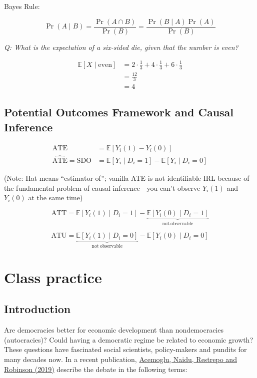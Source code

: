 \documentclass[
  11pt,
  letterpaper]{article}
\begin{document}
Bayes Rule:

\[
\Pr(A \mid B) = \frac{\Pr(A \cap B)}{\Pr(B)} = \frac{\Pr(B \mid A) \Pr(A)}{\Pr(B)}
\]

\emph{Q: What is the expectation of a six-sided die, given that the
number is even?}

\[
\begin{aligned}
\mathbb{E}[X \mid \mathrm{even}]  & = 2 \cdot \frac{1}{3 } + 4 \cdot \frac{1}{3} + 6 \cdot \frac{1}{3} \\
 & = \frac{12}{3} \\
 & = 4
\end{aligned}
\]

\subsection{Potential Outcomes Framework and Causal
Inference}\label{potential-outcomes-framework-and-causal-inference}

\[
\begin{aligned}
\mathrm{ATE}  & = \mathbb{E}[Y_{i}(1)-Y_{i}(0)] \\
 \widehat{ \mathrm{ATE} } = \mathrm{SDO}  & = \mathbb{E}[Y_{i} \mid D_{i} = 1]-\mathbb{E}[Y_{i} \mid D_{i} = 0]
\end{aligned}
\]

(Note: Hat means ``estimator of''; vanilla ATE is not identifiable IRL
because of the fundamental problem of causal inference - you can't
observe \(Y_{i}(1)\) and \(Y_{i}(0)\) at the same time)

\[
\mathrm{ATT} = \mathbb{E}[Y_{i}(1) \mid D_{i} = 1]-\underbrace{ \mathbb{E}[Y_{i}(0) \mid D_{i} = 1] }_{ \mathrm{not \ observable} }
\]

\[
\mathrm{ATU} = \underbrace{ \mathbb{E}[Y_{i}(1) \mid D_{i} = 0] }_{ \mathrm{not \ observable} }-\mathbb{E}[Y_{i}(0) \mid D_{i} = 0] 
\]

\newpage

\section{Class practice}\label{class-practice}

\subsection{Introduction}\label{introduction}

Are democracies better for economic development than nondemocracies
(autocracies)? Could having a democratic regime be related to economic
growth? These questions have fascinated social scientists, policy-makers
and pundits for many decades now. In a recent publication,
\href{https://economics.mit.edu/sites/default/files/publications/Democracy\%20Does\%20Cause\%20Growth.pdf}{Acemoglu,
Naidu, Restrepo and Robinson (2019)} describe the debate in the
following terms:
\end{document}
